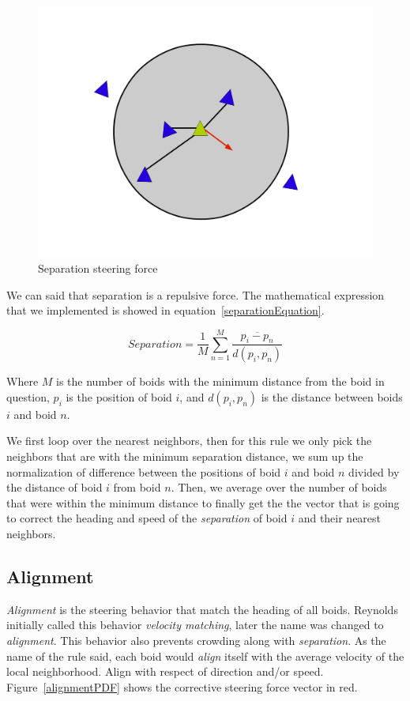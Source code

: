 \begin{figure}[htbp]
\begin{center}
\includegraphics[scale=0.3]{figures/separation.pdf}
\caption{Separation steering force}
\label{separationPDF}
\end{center}
\end{figure}

We can said that separation is a repulsive force. The mathematical expression that we implemented is showed in equation~\ref{separationEquation}.

\begin{equation}
\label{separationEquation}
Separation =\frac{1}{M} \sum_{n=1}^{M} \frac{\overline{p_i - p_n}}{d(p_i,p_n)}
\end{equation}

Where $M$ is the number of boids with the minimum distance from the boid in question, $p_i$ is the position of boid $i$, and $d(p_i,p_n)$ is the distance between boids $i$ and boid $n$.

We first loop over the nearest neighbors, then for this rule we only pick the neighbors that are with the minimum separation distance, we sum up the normalization of difference between the positions of boid $i$ and boid $n$ divided by the distance of boid $i$ from boid $n$. Then, we average over the number of boids that were within the minimum distance to finally get the the vector that is going to correct the heading and speed of the \textit{separation} of boid $i$  and their nearest neighbors. 

\subsection{Alignment}
\textit{Alignment} is the steering behavior that match the heading of all boids. Reynolds initially called this behavior \textit{velocity matching}, later the name was changed to \textit{alignment}. This behavior also prevents crowding along with \textit{separation}. As the name of the rule said, each boid would \textit{align} itself with the average velocity of the local neighborhood. Align with respect of direction and/or speed. Figure~\ref{alignmentPDF}  shows the corrective steering force vector in red.

